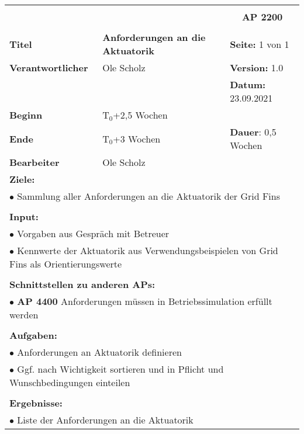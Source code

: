 \clearpage
\begin{table}[!h]
	\begin{center}
		\begin{tabular}{|p{35mm}||p{55mm}|p{50mm}||p{40mm}|}
			\hline
			\multicolumn{3}{|l||}{\textbf{}} & \multicolumn{1}{c|}{}\\
			\multicolumn{3}{|l||}{\textbf{}} & \multicolumn{1}{c|}{\textbf{AP 2200}}\\
			\multicolumn{3}{|l||}{\textbf{}} & \multicolumn{1}{c|}{}\\
			\hline\hline
			\textbf{Titel} & \multicolumn{2}{p{7cm}||}{\textbf{Anforderungen an die Aktuatorik}} 
			& \textbf{Seite:} 1 von 1\\
			\hline
			\textbf{Verantwortlicher} & \multicolumn{2}{l||}{Ole Scholz} & \textbf{Version:} 1.0\\
			\hline
			\multicolumn{3}{|l||}{} & \textbf{Datum:} 23.09.2021\\
			\hline\hline
			\textbf{Beginn} & \multicolumn{2}{l||}{T$_0$+2,5 Wochen} & \\
			\hline
			\textbf{Ende} & \multicolumn{2}{l||}{T$_0$+3 Wochen} & \textbf{Dauer}: 0,5 Wochen\\
			\hline\hline
			\textbf{Bearbeiter} & \multicolumn{3}{l|}{Ole Scholz}\\
			\hline\hline
			\multicolumn{4}{|p{150mm}|}{\textbf{Ziele:}}\\
			\multicolumn{4}{|p{150mm}|}{$\bullet$ Sammlung aller Anforderungen an die Aktuatorik der Grid Fins}\\
			\multicolumn{4}{|p{150mm}|}{}\\
			\multicolumn{4}{|p{150mm}|}{\textbf{Input:}}\\
			\multicolumn{4}{|p{150mm}|}{$\bullet$ Vorgaben aus Gespräch mit Betreuer}\\
			\multicolumn{4}{|p{150mm}|}{$\bullet$ Kennwerte der Aktuatorik aus Verwendungsbeispielen von Grid Fins als Orientierungswerte}\\
			\multicolumn{4}{|p{150mm}|}{}\\
			\multicolumn{4}{|p{150mm}|}{\textbf{Schnittstellen zu anderen APs:}}\\
			\multicolumn{4}{|p{150mm}|}{$\bullet$ \textbf{AP 4400} Anforderungen müssen in Betriebssimulation erfüllt werden}\\
			\multicolumn{4}{|p{150mm}|}{}\\
			\multicolumn{4}{|p{150mm}|}{\textbf{Aufgaben:}}\\
			\multicolumn{4}{|p{150mm}|}{$\bullet$ Anforderungen an Aktuatorik definieren}\\
			\multicolumn{4}{|p{150mm}|}{$\bullet$ Ggf. nach Wichtigkeit sortieren und in Pflicht und Wunschbedingungen einteilen}\\
			\multicolumn{4}{|p{150mm}|}{}\\
			\multicolumn{4}{|p{150mm}|}{\textbf{Ergebnisse:}}\\
			\multicolumn{4}{|p{150mm}|}{$\bullet$ Liste der Anforderungen an die Aktuatorik}\\
			\hline
		\end{tabular}
	\end{center}
\end{table}


